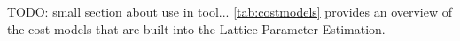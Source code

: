 TODO: small section about use in tool... \cref{tab:costmodels} provides an overview of the cost models that are built into the Lattice Parameter Estimation.






















